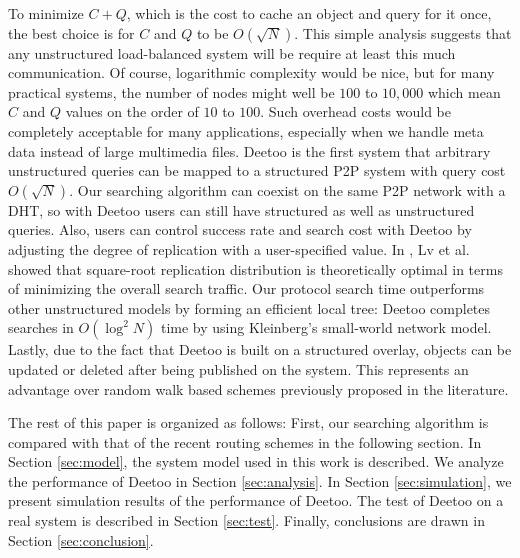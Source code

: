 \documentclass[9.5pt,journal,final,finalsubmission,twocolumn]{IEEEtran}
\begin{document}
To minimize $C+Q$, which
is the cost to cache an object and query for it once, the
best choice is for $C$ and $Q$ to be $O(\sqrt{N})$. 
This simple analysis
suggests that any unstructured load-balanced system will be require at least
this much communication.  Of course, logarithmic complexity would be nice, but
for many practical systems, the number of nodes might well be $100$ to
$10,000$ which mean $C$ and $Q$ values on the order of $10$ to $100$.
Such overhead costs would be completely acceptable for many applications,
 especially when we handle meta data instead of large multimedia files.
Deetoo is the first system that arbitrary unstructured queries can be mapped 
to a structured P2P system with query cost $O(\sqrt{N})$.
Our searching algorithm can coexist on the same P2P network
with a DHT, so with Deetoo
users can still have structured as well as unstructured queries.
Also, users can control success rate and search cost with Deetoo by 
adjusting the degree of replication with a user-specified value.
In \cite{LCKS02}, Lv et al. showed that
square-root replication distribution is theoretically optimal in
terms of minimizing the overall search traffic. 
Our protocol search time outperforms other unstructured models by forming 
an efficient local tree: 
Deetoo completes searches in  
$O(\log^2{N})$ time by using Kleinberg's small-world network model.  
Lastly, due to the fact that Deetoo is built on a structured overlay,
objects can be updated or deleted after being published on the
system.  This represents an advantage over random
walk based schemes previously proposed in the literature.

The rest of this paper is organized as follows: First, our searching
algorithm is compared with that of the recent routing schemes in the following section. 
In Section \ref{sec:model}, the system model
used in this work is described. We analyze the performance of Deetoo in
Section \ref{sec:analysis}. In Section \ref{sec:simulation}, we present
simulation results of the performance of Deetoo. 
The test of Deetoo on a real system is described in Section 
\ref{sec:test}. 
Finally, conclusions are 
drawn in Section \ref{sec:conclusion}.
\end{document}
